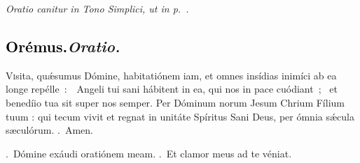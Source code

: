 \documentclass[12pt]{article} %
\newenvironment{rubric}{\vspace{2 mm}\color{benred8} \itshape \leftskip 0in \setlength{\parindent}{0.25in}}{\vspace{2 mm}}
\newenvironment{response}{\leftskip 0in \setlength{\parindent}{0in}}{\vspace{2 mm}}
\let\oldgresixstar\gresixstar
\renewcommand{\gresixstar}{\textcolor{benred8}{\oldgresixstar}}
\let\oldgredagger\gredagger
\renewcommand{\gredagger}{\textcolor{benred8}{\oldgredagger}}
\let\oldVbar\Vbar
\renewcommand{\Vbar}{\textcolor{benred8}{\oldVbar .}}
\let\oldRbar\Rbar
\renewcommand{\Rbar}{\textcolor{benred8}{\oldRbar .}}
\def\capitulumSpace{\hspace{20 mm}}
\begin{document}
\gresetfirstlineaboveinitial{\small \textsc{ \textbf{\textcolor{benred8}{\Vbar}}}}{\small \textsc{ \textbf{\textcolor{benred8}{\Vbar}}}}


\begin{rubric}
Oratio canitur in Tono Simplici, ut in p.~\pageref{OratioSimplex}.

\end{rubric}

\subsection*{\textcolor{black}{Or\'{e}mus.}\capitulumSpace \emph{Oratio.}}

\begin{response}\lettrine{V}{i}sita, qu\'{\ae}sumus D\'{o}mine, habitati\'{o}nem iam, et omnes ins\'{i}dias inim\'{i}ci ab ea longe rep\'{e}lle~:~\gredagger\ Angeli tui sani h\'{a}bitent in ea, qui nos in pace cu\'{o}diant~; \gresixstar\ et bened\'{i}io tua sit super nos semper. Per D\'{o}minum norum Jesum Chrium F\'{i}lium tuum : qui tecum vivit et regnat in unit\'{a}te Sp\'{i}ritus Sani Deus, per \'{o}mnia s\'{\ae}cula s\ae cul\'{o}rum. \Rbar\ Amen.

\end{response}

\begin{response}
\Vbar\ Dómine exáudi oratiónem meam. \Rbar\ Et clamor meus ad te véniat.

\end{response}

\vspace{1.5mm}

\gresetfirstlineaboveinitial{\small \textsc{ \textbf{\textcolor{benred8}{II}}}}{\small \textsc{ \textbf{\textcolor{benred8}{II}}}}

%
%
%
%
%
\end{document}
